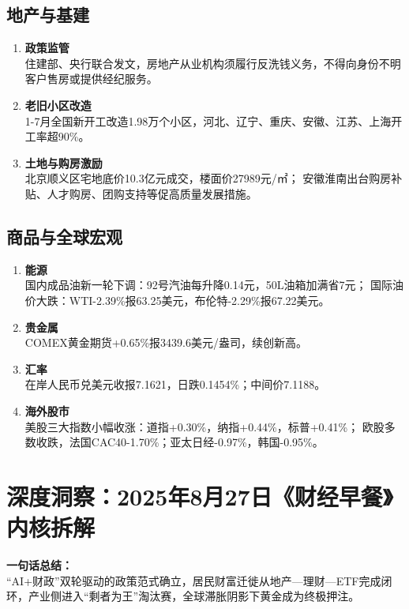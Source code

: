 \subsection{地产与基建}
\begin{enumerate}[leftmargin=*, nosep]
    \item \textbf{政策监管}  \\
    住建部、央行联合发文，房地产从业机构须履行反洗钱义务，不得向身份不明客户售房或提供经纪服务。
    \item \textbf{老旧小区改造}  \\
    1-7月全国新开工改造1.98万个小区，河北、辽宁、重庆、安徽、江苏、上海开工率超90\%。
    \item \textbf{土地与购房激励}  \\
    北京顺义区宅地底价10.3亿元成交，楼面价27989元/㎡；  
    安徽淮南出台购房补贴、人才购房、团购支持等促高质量发展措施。
\end{enumerate}

\subsection{商品与全球宏观}
\begin{enumerate}[leftmargin=*, nosep]
    \item \textbf{能源}  \\
    国内成品油新一轮下调：92号汽油每升降0.14元，50L油箱加满省7元；  
    国际油价大跌：WTI-2.39\%报63.25美元，布伦特-2.29\%报67.22美元。
    \item \textbf{贵金属}  \\
    COMEX黄金期货+0.65\%报3439.6美元/盎司，续创新高。
    \item \textbf{汇率}  \\
    在岸人民币兑美元收报7.1621，日跌0.1454\%；中间价7.1188。
    \item \textbf{海外股市}  \\
    美股三大指数小幅收涨：道指+0.30\%，纳指+0.44\%，标普+0.41\%；  
    欧股多数收跌，法国CAC40-1.70\%；亚太日经-0.97\%，韩国-0.95\%。
\end{enumerate}


\section{深度洞察：2025年8月27日《财经早餐》内核拆解}
\textbf{一句话总结：}  \\
“AI+财政”双轮驱动的政策范式确立，居民财富迁徙从地产—理财—ETF完成闭环，产业侧进入“剩者为王”淘汰赛，全球滞胀阴影下黄金成为终极押注。

